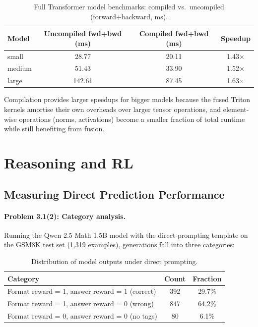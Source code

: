 \documentclass[11pt]{article}
\begin{document}
\begin{table}[H]
\centering
\caption{Full Transformer model benchmarks: compiled vs.\ uncompiled (forward+backward, ms).}
\begin{tabular}{lccc}
\toprule
Model & Uncompiled fwd+bwd (ms) & Compiled fwd+bwd (ms) & Speedup \\
\midrule
small  & 28.77  & 20.11 & 1.43$\times$ \\
medium & 51.43  & 33.90 & 1.52$\times$ \\
large  & 142.61 & 87.45 & 1.63$\times$ \\
\bottomrule
\end{tabular}
\end{table}

Compilation provides larger speedups for bigger models because the fused Triton kernels
amortise their own overheads over larger tensor operations, and element-wise operations
(norms, activations) become a smaller fraction of total runtime while still benefiting
from fusion.

\section{Reasoning and RL}

\subsection{Measuring Direct Prediction Performance}

\paragraph{Problem 3.1(2): Category analysis.}

Running the Qwen 2.5 Math 1.5B model with the direct-prompting template on the GSM8K
test set (1{,}319 examples), generations fall into three categories:

\begin{table}[H]
\centering
\caption{Distribution of model outputs under direct prompting.}
\begin{tabular}{lcc}
\toprule
Category & Count & Fraction \\
\midrule
Format reward = 1, answer reward = 1 (correct) & 392 & 29.7\% \\
Format reward = 1, answer reward = 0 (wrong) & 847 & 64.2\% \\
Format reward = 0, answer reward = 0 (no tags) & 80 & 6.1\% \\
\bottomrule
\end{tabular}
\end{table}
\end{document}
